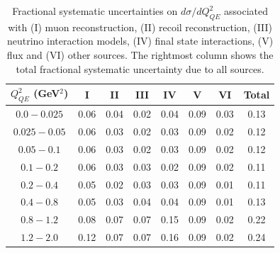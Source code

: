 \begingroup
\squeezetable
\begin{table}
\begin{tabular}{cccccccc}
$Q^2_{QE}$ (GeV$^2$) & I & II & III & IV & V & VI & Total \\
\hline
$0.0 - 0.025$ & 0.06 & 0.04 & 0.02 & 0.04 & 0.09 & 0.03 & 0.13 \\
$0.025 - 0.05$ & 0.06 & 0.03 & 0.02 & 0.03 & 0.09 & 0.02 & 0.12 \\
$0.05 - 0.1$ & 0.06 & 0.03 & 0.02 & 0.03 & 0.09 & 0.02 & 0.12 \\
$0.1 - 0.2$ & 0.06 & 0.03 & 0.03 & 0.02 & 0.09 & 0.02 & 0.11 \\
$0.2 - 0.4$ & 0.05 & 0.02 & 0.03 & 0.03 & 0.09 & 0.01 & 0.11 \\
$0.4 - 0.8$ & 0.05 & 0.03 & 0.04 & 0.04 & 0.09 & 0.01 & 0.13 \\
$0.8 - 1.2$ & 0.08 & 0.07 & 0.07 & 0.15 & 0.09 & 0.02 & 0.22 \\
$1.2 - 2.0$ & 0.12 & 0.07 & 0.07 & 0.16 & 0.09 & 0.02 & 0.24 \\
\hline
\end{tabular}
\caption{
Fractional systematic uncertainties on $d\sigma/dQ^2_{QE}$ associated with (I) muon reconstruction, (II) recoil reconstruction, (III) neutrino interaction models, (IV) final state interactions, (V) flux and (VI) other sources.  
The rightmost column shows the total fractional systematic uncertainty due to all sources.
}
\label{tab:systematics}
\end{table}
\endgroup
